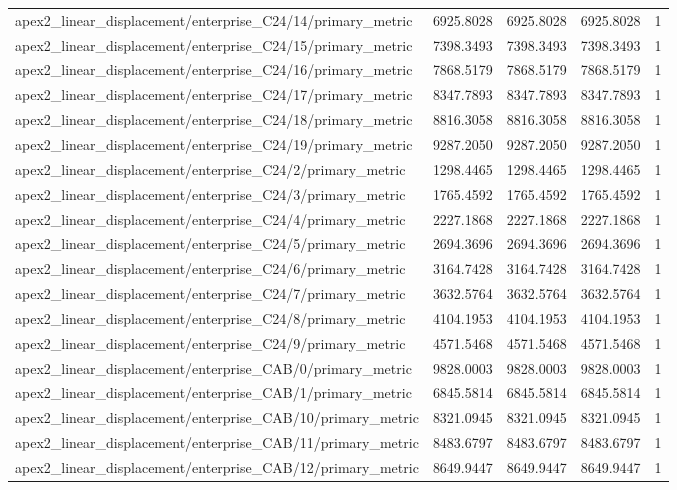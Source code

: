 \begin{table}[h]
\begin{tabular}{lrrrr}
apex2_linear_displacement/enterprise_C24/14/primary_metric & 6925.8028 & 6925.8028 & 6925.8028 & 1 \\
apex2_linear_displacement/enterprise_C24/15/primary_metric & 7398.3493 & 7398.3493 & 7398.3493 & 1 \\
apex2_linear_displacement/enterprise_C24/16/primary_metric & 7868.5179 & 7868.5179 & 7868.5179 & 1 \\
apex2_linear_displacement/enterprise_C24/17/primary_metric & 8347.7893 & 8347.7893 & 8347.7893 & 1 \\
apex2_linear_displacement/enterprise_C24/18/primary_metric & 8816.3058 & 8816.3058 & 8816.3058 & 1 \\
apex2_linear_displacement/enterprise_C24/19/primary_metric & 9287.2050 & 9287.2050 & 9287.2050 & 1 \\
apex2_linear_displacement/enterprise_C24/2/primary_metric & 1298.4465 & 1298.4465 & 1298.4465 & 1 \\
apex2_linear_displacement/enterprise_C24/3/primary_metric & 1765.4592 & 1765.4592 & 1765.4592 & 1 \\
apex2_linear_displacement/enterprise_C24/4/primary_metric & 2227.1868 & 2227.1868 & 2227.1868 & 1 \\
apex2_linear_displacement/enterprise_C24/5/primary_metric & 2694.3696 & 2694.3696 & 2694.3696 & 1 \\
apex2_linear_displacement/enterprise_C24/6/primary_metric & 3164.7428 & 3164.7428 & 3164.7428 & 1 \\
apex2_linear_displacement/enterprise_C24/7/primary_metric & 3632.5764 & 3632.5764 & 3632.5764 & 1 \\
apex2_linear_displacement/enterprise_C24/8/primary_metric & 4104.1953 & 4104.1953 & 4104.1953 & 1 \\
apex2_linear_displacement/enterprise_C24/9/primary_metric & 4571.5468 & 4571.5468 & 4571.5468 & 1 \\
apex2_linear_displacement/enterprise_CAB/0/primary_metric & 9828.0003 & 9828.0003 & 9828.0003 & 1 \\
apex2_linear_displacement/enterprise_CAB/1/primary_metric & 6845.5814 & 6845.5814 & 6845.5814 & 1 \\
apex2_linear_displacement/enterprise_CAB/10/primary_metric & 8321.0945 & 8321.0945 & 8321.0945 & 1 \\
apex2_linear_displacement/enterprise_CAB/11/primary_metric & 8483.6797 & 8483.6797 & 8483.6797 & 1 \\
apex2_linear_displacement/enterprise_CAB/12/primary_metric & 8649.9447 & 8649.9447 & 8649.9447 & 1 \\

\end{tabular}
\end{table}
